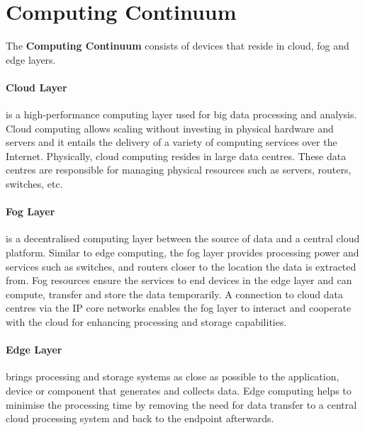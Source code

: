 



    \section{Computing Continuum}
    \label{sec:computing-continuum-background}

        The \textbf{Computing Continuum} consists of devices that reside in cloud, fog and edge layers.

        \paragraph{Cloud Layer }
        \label{par:cloud-layer-continuum}

            is a high-performance computing layer used for big data processing and analysis.
            Cloud computing allows scaling without investing in physical hardware and servers and it entails the delivery of a variety of computing services over the Internet. Physically, cloud computing resides in large data centres. These data centres are responsible for managing physical resources such as servers, routers, switches, etc.

        \paragraph{Fog Layer }
        \label{par:fog-layer-continuum}

            is a decentralised computing layer between the source of data and a central cloud platform. Similar to edge computing, the fog layer provides processing power and services such as switches, and routers closer to the location the data is extracted from. Fog resources ensure the services to end devices in the edge layer and can compute, transfer and store the data temporarily. A connection to cloud data centres via the IP core networks enables the fog layer to interact and cooperate with the cloud for enhancing processing and storage capabilities.


        \paragraph{Edge Layer }
        \label{par:edge-layer-continuum}

            brings processing and storage systems as close as possible to the application, device or component that generates and collects data.
            Edge computing helps to minimise the processing time by removing the need for data transfer to a central cloud processing system and back to the endpoint afterwards.


